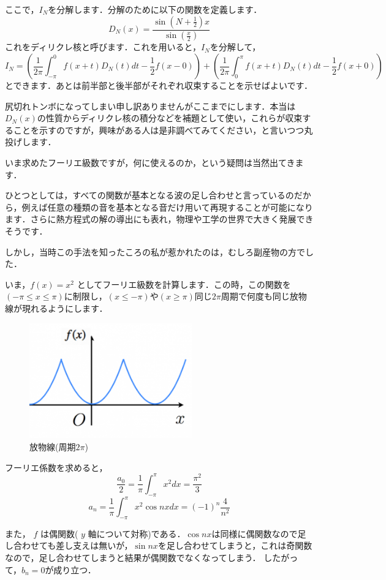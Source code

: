 ここで，$I_N$を分解します．分解のために以下の関数を定義します．
\[D_N(x) = \frac{\sin(N + \frac{1}{2})x}{\sin(\frac{x}{2})}\]
これをディリクレ核と呼びます．これを用いると，$I_N$を分解して，
\[
  I_N = (\frac{1}{2\pi} \int_{-\pi}^0 f(x+t) D_N(t) dt - \frac{1}{2} f(x-0)) +  (\frac{1}{2\pi} \int_0^\pi f(x+t) D_N(t) dt - \frac{1}{2} f(x+0))
\]
とできます．あとは前半部と後半部がそれぞれ収束することを示せばよいです．

尻切れトンボになってしまい申し訳ありませんがここまでにします．本当は$D_N(x)$の性質からディリクレ核の積分などを補題として使い，これらが収束することを示すのですが，興味がある人は是非調べてみてください，と言いつつ丸投げします．

いま求めたフーリエ級数ですが，何に使えるのか，という疑問は当然出てきます．

ひとつとしては，すべての関数が基本となる波の足し合わせと言っているのだから，例えば任意の種類の音を基本となる音だけ用いて再現することが可能になります．さらに熱方程式の解の導出にも表れ，物理や工学の世界で大きく発展できそうです．

しかし，当時この手法を知ったころの私が惹かれたのは，むしろ副産物の方でした．

いま，$f(x) = x^2$ としてフーリエ級数を計算します．この時，この関数を$({-\pi} \leq x \leq \pi)$に制限し，$(x \leq -\pi)$や$(x \geq \pi)$同じ${2\pi}$周期で何度も同じ放物線が現れるようにします．

\begin{figure}[h]
  \begin{center}
    \includegraphics[clip,width=7.0cm]{osawa.png}
    \caption{放物線(周期$2\pi$)}
    \label{f_para}
  \end{center}
\end{figure}

フーリエ係数を求めると，
\[
  \frac{a_0}{2} = \frac{1}{\pi} \int_{-\pi}^\pi x^2 dx = \frac{\pi^2}{3}
\]
\[
  a_n = \frac{1}{\pi} \int_{-\pi}^\pi x^2 \cos nx dx = (-1)^n \frac{4}{n^2}
\]

また， $f$ は偶関数( $y$ 軸について対称)である．$\cos nx$は同様に偶関数なので足し合わせても差し支えは無いが，$\sin nx$を足し合わせてしまうと，これは奇関数なので，足し合わせてしまうと結果が偶関数でなくなってしまう．
したがって，$b_n = 0$が成り立つ．

